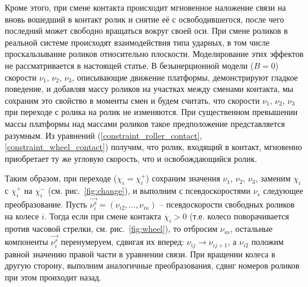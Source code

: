 Кроме этого, при смене контакта происходит мгновенное наложение связи на вновь вошедший в контакт ролик и снятие её с освободившегося, после чего последний может свободно вращаться вокруг своей оси. При смене роликов в реальной системе происходят взаимодействия типа ударных, в том числе проскальзывание роликов относительно плоскости. Моделирование этих эффектов не рассматривается в настоящей статье. В безынерционной модели ($B = 0$) скорости $\nu_1$, $\nu_2$, $\nu_3$, описывающие движение платформы, демонстрируют гладкое поведение, и добавляя массу роликов на участках между сменами контакта, мы сохраним это свойство в моменты смен и будем считать, что скорости $\nu_1$, $\nu_2$, $\nu_3$ при переходе с ролика на ролик не изменяются. При существенном превышении массы платформы над массами роликов такое предположение представляется разумным. Из уравнений (\ref{constraint_roller_contact}, \ref{constraint_wheel_contact}) получим, что ролик, входящий в контакт, мгновенно приобретает ту же угловую скорость, что и освобождающийся ролик.

Таким образом, при переходе ($\chi_i = \chi_i^+$) сохраним значения $\nu_1$, $\nu_2$, $\nu_3$, заменим $\chi_i$ с $\chi_i^+$ на $\chi_i^-$ (см. рис.~\ref{fig:change}), и выполним с псевдоскоростями $\nu_s$ следующее преобразование. Пусть $\vec{\nu_i^s} = (\nu_{i2},\ldots,\nu_{in})$ -- псевдоскорости свободных роликов на колесе $i$. Тогда если при смене контакта $\dot{\chi_i} > 0$ (т.е. колесо поворачивается против часовой стрелки, см. рис.~\ref{fig:wheel}), то отбросим $\nu_{in}$, остальные компоненты $\vec{\nu_i^s}$ перенумеруем, сдвигая их вперед: $\nu_{ij} \rightarrow \nu_{ij+1}$, а $\nu_{i2}$ положим равной значению правой части в уравнении связи. При вращении колеса в другую сторону, выполним аналогичные преобразования, сдвиг номеров роликов при этом проиходит назад.

